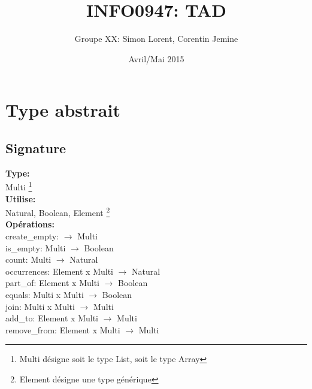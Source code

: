 \documentclass[a4paper, 11pt, oneside]{article}
\begin{document}

\title{INFO0947: TAD}
\author{Groupe XX: Simon Lorent, Corentin Jemine}
\date{Avril/Mai 2015}

\maketitle
\clearpage

\section{Type abstrait}
	\subsection{Signature}
	\noindent \textbf{Type:}
	\\ \indent Multi \footnote{Multi désigne soit le type List, soit le type Array}
	\\ \textbf{Utilise:}
	\\ \indent Natural, Boolean, Element \footnote{Element désigne une type générique}
	\\ \textbf{Opérations:}
	\\ \indent create\_empty: $\rightarrow$ Multi
	\\ \indent is\_empty: Multi $\rightarrow$ Boolean
	\\ \indent count: Multi $\rightarrow$ Natural
	\\ \indent occurrences: Element x Multi $\rightarrow$ Natural
	\\ \indent part\_of: Element x Multi $\rightarrow$ Boolean
	\\ \indent equals: Multi x Multi $\rightarrow$ Boolean
	\\ \indent join: Multi x Multi $\rightarrow$ Multi
	\\ \indent add\_to: Element x Multi $\rightarrow$ Multi
	\\ \indent remove\_from: Element x Multi $\rightarrow$ Multi
\end{document}
